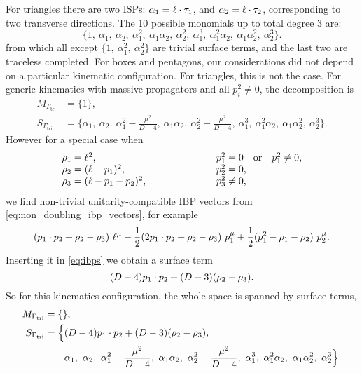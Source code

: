 For triangles there are two ISPs: $ \alpha_1 = \sp(\ell,\tau_1)$, and $\alpha_2 = \sp(\ell,\tau_2)$,
corresponding to two transverse directions.
The 10 possible monomials up to total degree 3 are:
\[
\{1,~\alpha_1,~\alpha_2,~\alpha_1^2,~\alpha_1\alpha_2,~\alpha_2^2,~ \alpha_1^3,~ \alpha_1^2\alpha_2,~ \alpha_1\alpha_2^2,~ \alpha_2^3\}.
\]
from which all except $\{1,~\alpha_1^2,~\alpha_2^2\}$ are trivial surface terms,
and the last two are traceless completed.
For boxes and pentagons, our considerations did not depend on a particular kinematic configuration.
For triangles, this is not the case. For generic kinematics with massive propagators
and all $p_i^2\neq 0$, the decomposition is 
\begin{align*}
  M_{\Gamma_\text{tri} } &= \{1\}, \\
   S_{\Gamma_\text{tri} } &= 
  \{\alpha_1,~\alpha_2,~\alpha_1^2 - \frac{\mu^2}{D-4},~\alpha_1\alpha_2,~\alpha_2^2- \frac{\mu^2}{D-4},~ \alpha_1^3,~ \alpha_1^2\alpha_2,~ \alpha_1\alpha_2^2,~ \alpha_2^3\}.
\end{align*}
However for a special case when
\begin{equation}
  \begin{tabular}{ll}
    $\rho_1 = \ell^2$,               &  $p_1^2=0 \qor p_1^2\neq 0$, \\
    $\rho_2 = (\ell-p_1)^2$,         &  $p_2^2=0$,  \\
    $\rho_3 = (\ell-p_1-p_2)^2$, \hspace{2cm}    & $p_3^2\neq 0$, \\
  \end{tabular}
\end{equation}
we find non-trivial unitarity-compatible IBP vectors from \cref{eq:non_doubling_ibp_vectors}, for example
\[
  (\sp(p_1,p_2) + \rho_2 - \rho_3)~\ell^\mu  - \frac{1}{2} (2 \sp(p_1,p_2) + \rho_2 - \rho_3)~p_1^\mu  + \frac{1}{2}   (p_1^2 - \rho_1 - \rho_2)~p_2^\mu.
\]
Inserting it in \cref{eq:ibps} we obtain a surface term
\[  
  (D-4) \sp(p_1,p_2) + (D-3) (\rho_2-\rho_3).
\]
So for this kinematics configuration, the whole space is spanned by surface terms,
\begin{align*}
  M_{\Gamma_\text{tri} } &= \{\}, \\
   S_{\Gamma_\text{tri} } &= 
  \Big\{(D-4) \sp(p_1,p_2) + (D-3) (\rho_2-\rho_3),\\ 
    &\qquad \alpha_1,~\alpha_2,~\alpha_1^2 - \frac{\mu^2}{D-4},~\alpha_1\alpha_2,~\alpha_2^2- \frac{\mu^2}{D-4},~ \alpha_1^3,~ \alpha_1^2\alpha_2,~ \alpha_1\alpha_2^2,~ \alpha_2^3 \Big\}.
\end{align*}


